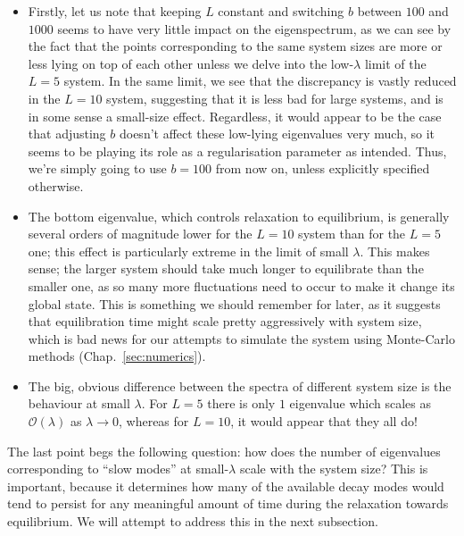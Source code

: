 \begin{itemize}
 \item Firstly, let us note that keeping $L$ constant and switching $b$ between $100$
 and $1000$ seems to have very little impact on the eigenspectrum, as we can see by the fact that the points corresponding to the same system sizes are
 more or less lying on top of each other unless we delve into the low-$\lambda$ limit
 of the $L=5$ system. In the same limit, we see that the discrepancy is vastly reduced
 in the $L=10$ system, suggesting that it is less bad for large systems, and is in some sense a small-size effect. Regardless, it would appear to be the case that adjusting $b$
 doesn't affect these low-lying eigenvalues very much, so it seems to be playing its
 role as a regularisation parameter as intended. Thus, we're simply going to use $b=100$
 from now on, unless explicitly specified otherwise.
 \item The bottom eigenvalue, which controls relaxation to equilibrium, is generally
 several orders of magnitude lower for the $L=10$ system than for the $L=5$ one;
 this effect is particularly extreme in the limit of small $\lambda$.
 This makes sense; the larger system should take much longer to equilibrate than the
 smaller one, as so many more fluctuations need to occur to make it change its global
 state. This is something we should remember for later, as it suggests that equilibration time might scale
 pretty aggressively with system size, which is bad news for our attempts to simulate
 the system using Monte-Carlo methods (Chap.~\ref{sec:numerics}).
 \item The big, obvious difference between the spectra of different system size is
 the behaviour at small $\lambda$. For $L=5$ there is only $1$ eigenvalue which scales
 as $\mathcal{O}(\lambda)$ as $\lambda \rightarrow 0$, whereas for $L=10$, it would
 appear that they all do!
\end{itemize}
The last point begs the following question: how does the number of eigenvalues
corresponding to ``slow modes'' at small-$\lambda$ scale with the system size? This is 
important,
because it determines how many of the available decay modes would tend to persist for any 
meaningful amount of time during the relaxation towards equilibrium. We will attempt to
address this in the next subsection.


